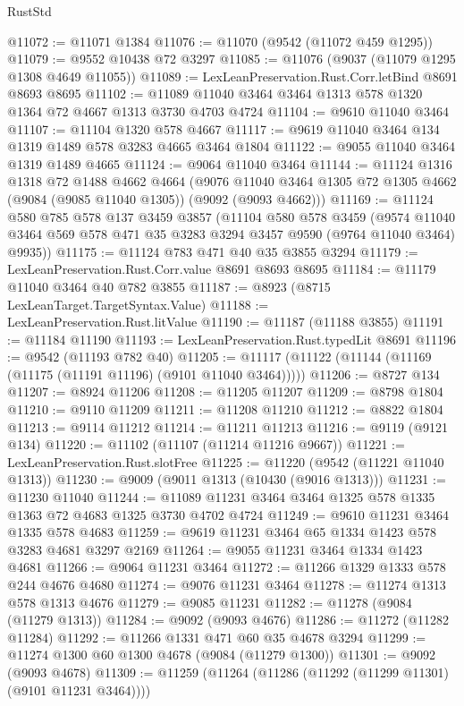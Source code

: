 \begin{lexlean}{RustStd}
\begin{coremodule}
@11072 := @11071 @1384
@11076 := @11070 (@9542 (@11072 @459 @1295))
@11079 := @9552 @10438 @72 @3297
@11085 := @11076 (@9037 (@11079 @1295 @1308 @4649 @11055))
@11089 := LexLeanPreservation.Rust.Corr.letBind @8691 @8693 @8695
@11102 := @11089 @11040 @3464 @3464 @1313 @578 @1320 @1364 @72 @4667 @1313 @3730 @4703 @4724
@11104 := @9610 @11040 @3464
@11107 := @11104 @1320 @578 @4667
@11117 := @9619 @11040 @3464 @134 @1319 @1489 @578 @3283 @4665 @3464 @1804
@11122 := @9055 @11040 @3464 @1319 @1489 @4665
@11124 := @9064 @11040 @3464
@11144 := @11124
    @1316
    @1318
    @72
    @1488
    @4662
    @4664
    (@9076 @11040 @3464 @1305 @72 @1305 @4662 (@9084 (@9085 @11040 @1305)) (@9092 (@9093 @4662)))
@11169 := @11124
    @580
    @785
    @578
    @137
    @3459
    @3857
    (@11104
      @580
      @578
      @3459
      (@9574 @11040 @3464 @569 @578 @471 @35 @3283 @3294 @3457 @9590 (@9764 @11040 @3464) @9935))
@11175 := @11124 @783 @471 @40 @35 @3855 @3294
@11179 := LexLeanPreservation.Rust.Corr.value @8691 @8693 @8695
@11184 := @11179 @11040 @3464 @40 @782 @3855
@11187 := @8923 (@8715 LexLeanTarget.TargetSyntax.Value)
@11188 := LexLeanPreservation.Rust.litValue
@11190 := @11187 (@11188 @3855)
@11191 := @11184 @11190
@11193 := LexLeanPreservation.Rust.typedLit @8691
@11196 := @9542 (@11193 @782 @40)
@11205 := @11117 (@11122 (@11144 (@11169 (@11175 (@11191 @11196) (@9101 @11040 @3464)))))
@11206 := @8727 @134
@11207 := @8924 @11206
@11208 := @11205 @11207
@11209 := @8798 @1804
@11210 := @9110 @11209
@11211 := @11208 @11210
@11212 := @8822 @1804
@11213 := @9114 @11212
@11214 := @11211 @11213
@11216 := @9119 (@9121 @134)
@11220 := @11102 (@11107 (@11214 @11216 @9667))
@11221 := LexLeanPreservation.Rust.slotFree
@11225 := @11220 (@9542 (@11221 @11040 @1313))
@11230 := @9009 (@9011 @1313 (@10430 (@9016 @1313)))
@11231 := @11230 @11040
@11244 := @11089 @11231 @3464 @3464 @1325 @578 @1335 @1363 @72 @4683 @1325 @3730 @4702 @4724
@11249 := @9610 @11231 @3464 @1335 @578 @4683
@11259 := @9619 @11231 @3464 @65 @1334 @1423 @578 @3283 @4681 @3297 @2169
@11264 := @9055 @11231 @3464 @1334 @1423 @4681
@11266 := @9064 @11231 @3464
@11272 := @11266 @1329 @1333 @578 @244 @4676 @4680
@11274 := @9076 @11231 @3464
@11278 := @11274 @1313 @578 @1313 @4676
@11279 := @9085 @11231
@11282 := @11278 (@9084 (@11279 @1313))
@11284 := @9092 (@9093 @4676)
@11286 := @11272 (@11282 @11284)
@11292 := @11266 @1331 @471 @60 @35 @4678 @3294
@11299 := @11274 @1300 @60 @1300 @4678 (@9084 (@11279 @1300))
@11301 := @9092 (@9093 @4678)
@11309 := @11259 (@11264 (@11286 (@11292 (@11299 @11301) (@9101 @11231 @3464))))

\end{coremodule}
\end{lexlean}
